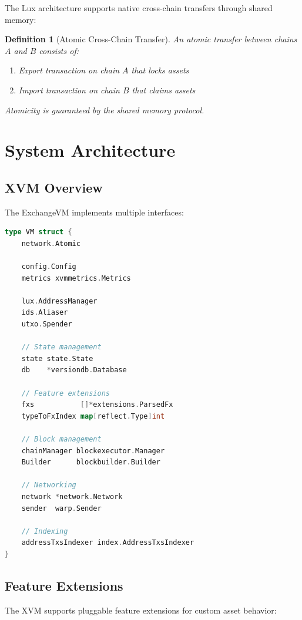 \documentclass[11pt,a4paper]{article}
\newtheorem{definition}{Definition}
\begin{document}
The Lux architecture supports native cross-chain transfers through shared memory:

\begin{definition}[Atomic Cross-Chain Transfer]
An atomic transfer between chains $A$ and $B$ consists of:
\begin{enumerate}
    \item Export transaction on chain $A$ that locks assets
    \item Import transaction on chain $B$ that claims assets
\end{enumerate}
Atomicity is guaranteed by the shared memory protocol.
\end{definition}

\section{System Architecture}

\subsection{XVM Overview}

The ExchangeVM implements multiple interfaces:

\begin{lstlisting}[language=Go,caption={XVM Core Structure}]
type VM struct {
    network.Atomic

    config.Config
    metrics xvmmetrics.Metrics

    lux.AddressManager
    ids.Aliaser
    utxo.Spender

    // State management
    state state.State
    db    *versiondb.Database

    // Feature extensions
    fxs           []*extensions.ParsedFx
    typeToFxIndex map[reflect.Type]int

    // Block management
    chainManager blockexecutor.Manager
    Builder      blockbuilder.Builder

    // Networking
    network *network.Network
    sender  warp.Sender

    // Indexing
    addressTxsIndexer index.AddressTxsIndexer
}
\end{lstlisting}

\subsection{Feature Extensions}

The XVM supports pluggable feature extensions for custom asset behavior:
\end{document}
